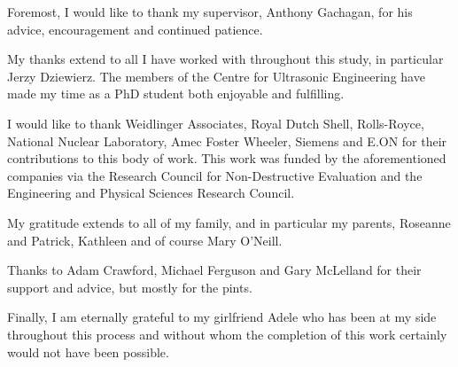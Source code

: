 
\begin{acknowledgements}      


Foremost, I would like to thank my supervisor, Anthony Gachagan, for his advice, encouragement and continued patience.

My thanks extend to all I have worked with throughout this study, in particular Jerzy Dziewierz. The members of the Centre for Ultrasonic Engineering have made my time as a PhD student both enjoyable and fulfilling.

I would like to thank Weidlinger Associates, Royal Dutch Shell, Rolls-Royce, National Nuclear Laboratory, Amec Foster Wheeler, Siemens and E.ON for their contributions to this body of work. This work was funded by the aforementioned companies via the Research Council for Non-Destructive Evaluation and the Engineering and Physical Sciences Research Council.

My gratitude extends to all of my family, and in particular my parents, Roseanne and Patrick, Kathleen and of course Mary O'Neill.

Thanks to Adam Crawford, Michael Ferguson and Gary McLelland for their support and advice, but mostly for the pints.

Finally, I am eternally grateful to my girlfriend Adele who has been at my side throughout this process and without whom the completion of this work certainly would not have been possible.


\end{acknowledgements}



